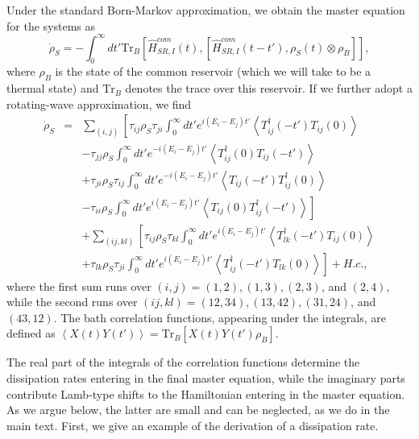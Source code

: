 \documentclass[12pt]{iopart}
\begin{document}
Under the standard Born-Markov approximation, we obtain the master equation for the systems as
\begin{equation}\label{ME}
\dot{\rho}_{S}=-\int_{0}^{\infty}dt' \mathrm{Tr}_{B}\left[\hat{H}_{SR,I}^{com}(t),\left[\hat{H}_{SR,I}^{com}(t-t'),
\rho_{S}(t)\otimes\rho_{B}\right]\right],
\end{equation}
where $\rho_B$ is the state of the common reservoir (which we will take to be a thermal state) and $\mathrm{Tr}_{B}$ denotes the trace over this reservoir. If we further adopt a rotating-wave approximation, we find
\begin{eqnarray}\label{ME2}
\dot{\rho}_{S}&=&\sum_{(i,j)}\left[\tau_{ij}\rho_{S}\tau_{ji}\int_{0}^{\infty}dt'e^{i(E_{i}-E_{j})t'}\left\langle T_{ij}^{\dag}(-t')
T_{ij}(0)\right\rangle\right.\nonumber\\
&&-\tau_{jj}\rho_{S}\int_{0}^{\infty}dt'e^{-i(E_{i}-E_{j})t'}\left\langle T_{ij}^{\dag}(0)
T_{ij}(-t')\right\rangle \nonumber\\
&&+\tau_{ji}\rho_{S}\tau_{ij}\int_{0}^{\infty}dt'e^{-i(E_{i}-E_{j})t'}\left\langle T_{ij}(-t')
T_{ij}^{\dag}(0)\right\rangle\nonumber\\
&&\left.-\tau_{ii}\rho_{S}\int_{0}^{\infty}dt'e^{i(E_{i}-E_{j})t'}\left\langle T_{ij}(0)
T_{ij}^{\dag}(-t')\right\rangle \right]\nonumber\\
&&+\sum_{(ij,kl)}\left[\tau_{ij}\rho_{S}\tau_{kl}\int_{0}^{\infty}dt'e^{i(E_{i}-E_{j})t'}\left\langle T_{lk}^{\dag}(-t')
T_{ij}(0)\right\rangle\right.\nonumber\\
&&\left.+\tau_{lk}\rho_{S}\tau_{ji}\int_{0}^{\infty}dt'e^{i(E_{i}-E_{j})t'}\left\langle T_{ij}^{\dag}(-t')
T_{lk}(0)\right\rangle\right]+H.c.,
\end{eqnarray}
where the first sum runs over $(i,j)=(1,2),(1,3),(2,3)$, and $(2,4)$, while the second runs over $(ij,kl)=(12,34),(13,42),(31,24)$, and $(43, 12)$. The bath correlation functions, appearing under the integrals, are defined as $\left\langle X(t)Y(t')\right\rangle=\mathrm{Tr}_{B}\left[X(t)Y(t')\rho_{B}\right]$.

The real part of the integrals of the correlation functions determine the dissipation rates entering in the final master equation, while the imaginary parts contribute Lamb-type shifts to the Hamiltonian entering in the master equation. As we argue below, the latter are small and can be neglected, as we do in the main text. First, we give an example of the derivation of a dissipation rate.
\end{document}
